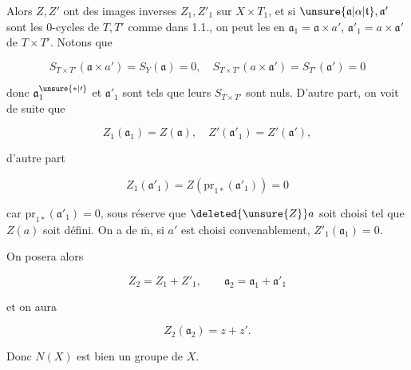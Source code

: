 Alors $Z,Z'$ ont des images inverses $Z_1,Z'_1$ sur $X\times T_1$, et si $\unsure{\mathfrak a|\alpha|\mathfrak{t}},\mathfrak a'$ sont les $0$-cycles de $T,T'$ comme dans 1.1., on peut les  en $\mathfrak a_1=\mathfrak a\times a'$, $\mathfrak a'_1=a\times\mathfrak a'$ de $T\times T'$. Notons que


\[
S_{T\times T'}(\mathfrak a\times a')=S_Y(\mathfrak a)=0,\quad S_{T\times T'}(a\times\mathfrak a')=S_{T'}(\mathfrak a')=0
\]

donc $\mathfrak a_1^{\unsure{*|\prime}}$ et $\mathfrak a'_1$ sont  tels que leurs $S_{T\times T'}$ sont nuls. D'autre part, on voit de suite que

\[
Z_1(\mathfrak a_1)=Z(\mathfrak a),\quad Z'(\mathfrak a'_1)=Z'(\mathfrak a'),
\]

 d'autre part

\[
Z_1(\mathfrak a'_1)=Z(\mathrm{pr}_{1*}(\mathfrak a'_1))=0
\]

car $\mathrm{pr}_{1*}(\mathfrak a'_1)=0$, sous réserve que $\deleted{\unsure{Z}}a$ soit choisi tel que $Z(a)$ soit défini. On a de $\overline{\mathrm m}$, si $a'$ est choisi convenablement, $Z'_1(\mathfrak a_1)=0$.


On posera alors

\[
Z_2=Z_1+Z'_1,\qquad\mathfrak a_2=\mathfrak a_1+\mathfrak a'_1
\]

et on aura

\[
Z_2(\mathfrak a_2)=z+z'.
\]

 Donc $N(X)$ est bien un groupe de $X$.

